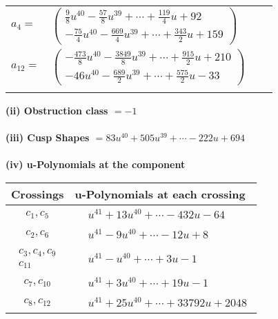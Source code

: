 \documentclass[1p]{elsarticle_modified}
\theoremstyle{definition}
\begin{document}
\begin{tabular}{m{7pt} m{180pt} m{7pt} m{180pt} }
\flushright $a_{4}=$&$\begin{pmatrix}\frac{9}{8} u^{40}-\frac{57}{8} u^{39}+\cdots+\frac{119}{4} u+92\\-\frac{75}{4} u^{40}-\frac{669}{4} u^{39}+\cdots+\frac{343}{2} u+159\end{pmatrix}$ \\
\flushright $a_{12}=$&$\begin{pmatrix}-\frac{473}{8} u^{40}-\frac{3849}{8} u^{39}+\cdots+\frac{915}{2} u+210\\-46 u^{40}-\frac{689}{2} u^{39}+\cdots+\frac{575}{2} u-33\end{pmatrix}$\\&\end{tabular}
\flushleft \textbf{(ii) Obstruction class $= -1$}\\~\\
\flushleft \textbf{(iii) Cusp Shapes $= 83 u^{40}+505 u^{39}+\cdots-222 u+694$}\\~\\
\newpage\renewcommand{\arraystretch}{1}
\flushleft \textbf{(iv) u-Polynomials at the component}\newline \\
\begin{tabular}{m{50pt}|m{274pt}}
Crossings & \hspace{64pt}u-Polynomials at each crossing \\
\hline $$\begin{aligned}c_{1},c_{5}\end{aligned}$$&$\begin{aligned}
&u^{41}+13 u^{40}+\cdots-432 u-64
\end{aligned}$\\
\hline $$\begin{aligned}c_{2},c_{6}\end{aligned}$$&$\begin{aligned}
&u^{41}-9 u^{40}+\cdots-12 u+8
\end{aligned}$\\
\hline $$\begin{aligned}c_{3},c_{4},c_{9}\\c_{11}\end{aligned}$$&$\begin{aligned}
&u^{41}- u^{40}+\cdots+3 u-1
\end{aligned}$\\
\hline $$\begin{aligned}c_{7},c_{10}\end{aligned}$$&$\begin{aligned}
&u^{41}+3 u^{40}+\cdots+19 u-1
\end{aligned}$\\
\hline $$\begin{aligned}c_{8},c_{12}\end{aligned}$$&$\begin{aligned}
&u^{41}+25 u^{40}+\cdots+33792 u+2048
\end{aligned}$\\
\hline
\end{tabular}\\~\\
\end{document}
